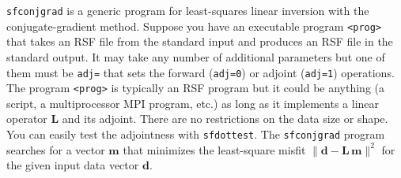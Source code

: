 \texttt{sfconjgrad} is a generic program for least-squares linear
inversion with the conjugate-gradient method. Suppose you have an
executable program \texttt{<prog>} that takes an RSF file from the
standard input and produces an RSF file in the standard output. It may
take any number of additional parameters but one of them must be
\texttt{adj=} that sets the forward (\texttt{adj=0}) or adjoint
(\texttt{adj=1}) operations.  The program \texttt{<prog>} is typically
an RSF program but it could be anything (a script, a multiprocessor
MPI program, etc.) as long as it implements a linear operator
$\mathbf{L}$ and its adjoint. There are no restrictions on the data
size or shape. You can easily test the adjointness with
\texttt{sfdottest}. The \texttt{sfconjgrad} program searches for a
vector $\mathbf{m}$ that minimizes the least-square misfit 
$\|\mathbf{d - L\,m}\|^2$ for the given input data vector $\mathbf{d}$.

